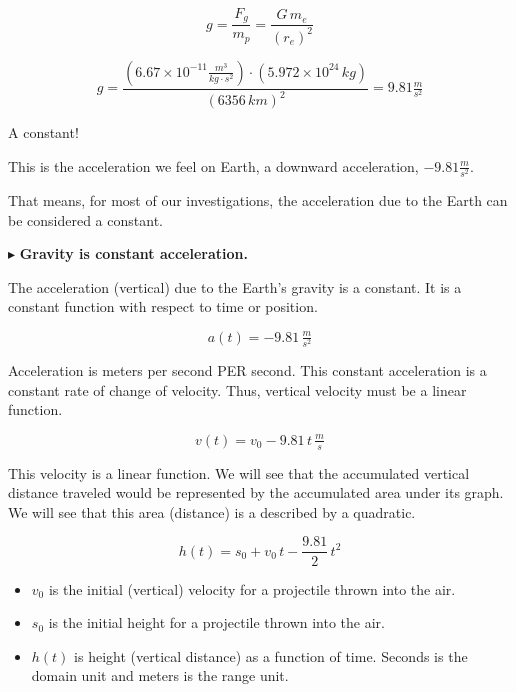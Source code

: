 \documentclass{ximera}
\begin{document}
\[ g = \frac{F_g}{m_p}  = \frac{G \, m_e}{(r_e)^2}    \]


\[ g = \frac{(6.67 \times 10^{-11} \frac{m^3}{kg \cdot s^2}) \cdot (5.972 \times 10^{24} \, kg)}{(6356 \, km)^2} = 9.81 \tfrac{m}{s^2}   \]


A constant! 

This is the acceleration we feel on Earth, a downward acceleration, $-9.81 \frac{m}{s^2}$.   

That means, for most of our investigations, the acceleration due to the Earth can be considered a constant.




$\blacktriangleright$ \textbf{\textcolor{blue!55!black}{Gravity is constant acceleration.}}  


The acceleration (vertical) due to the Earth's gravity is a constant.  It is a constant function with respect to time or position.


\[ a(t) = -9.81 \, \tfrac{m}{s^2}  \]



Acceleration is meters per second PER second.  This constant acceleration is a constant rate of change of velocity.  Thus, vertical velocity must be a linear function.




\[ v(t) = v_0 - 9.81 \, t  \, \tfrac{m}{s}\]



This velocity is a linear function. We will see that the accumulated vertical distance traveled would be represented by the accumulated area under its graph. We will see that this area (distance) is a described by a quadratic. 




\[ h(t) = s_0 + v_0 \, t - \frac{9.81}{2} \, t^2  \]




\begin{itemize}
\item $v_0$ is the initial (vertical) velocity for a projectile thrown into the air. 

\item $s_0$ is the initial height for a projectile thrown into the air. 

\item $h(t)$ is height (vertical distance) as a function of time.  Seconds is the domain unit and meters is the range unit.
\end{itemize}
\end{document}
